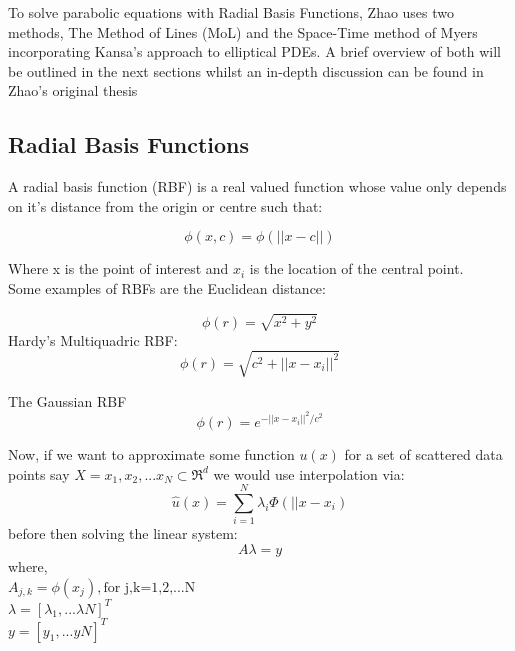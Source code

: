 \documentclass[a4paper]{amsart}
\begin{document}
To solve parabolic equations with Radial Basis Functions, Zhao uses two methods, The Method of Lines (MoL) and the Space-Time method of Myers incorporating Kansa's approach to elliptical PDEs. A brief overview of both will be outlined in the next sections whilst an in-depth discussion can be found in Zhao's original thesis \cite{mski0}

\subsection{Radial Basis Functions}\label{sec:RBF}

A radial basis function (RBF) is a real valued function whose value only depends on it's distance from the origin or centre such that:

\begin{equation}
\phi(x,c) = \phi(||x-c||)
\end{equation}

Where x is the point of interest and $x_{i}$ is the location of the central point. \\Some examples of RBFs are the Euclidean distance:

\begin{equation}
\phi(r) = \sqrt{x^{2} + y^{2}}
\end{equation}
Hardy's Multiquadric RBF:
\begin{equation}
\phi(r) = \sqrt{c^{2} + ||x-x_{i}||^{2}}
\end{equation}

The Gaussian RBF
\begin{equation}
\phi(r) = e^{-||x-x_{i}||^{2} / c^{2}}
\end{equation}

Now, if we want to approximate some function $u(x)$ for a set of scattered data points say $X={x_{1},x_{2},...x_{N}} \subset \Re^{d}$ we would use interpolation via:
\begin{equation}
\hat u(x) = \sum^{N}_{i=1} \lambda_{i} \Phi(||x - x_{i})
\label{RBFA}
\end{equation}
before then solving the linear system:
\begin{equation}
A\lambda =y
\end{equation}
where,
\\ $A_{j,k}= \phi(x_{j}), \mbox{for j,k=1,2,...N}$
\\$\lambda=[\lambda_{1},...\lambda{N}]^{T}$
\\$y=[y_{1},...y{N}]^{T}$\\
\end{document}

